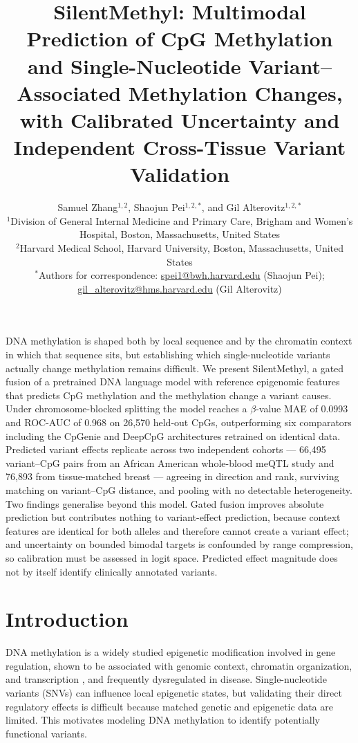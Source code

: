 \documentclass[10pt,letterpaper,twocolumn]{article}
\title{\LARGE\bfseries SilentMethyl: Multimodal Prediction of CpG Methylation and
Single-Nucleotide Variant--Associated Methylation Changes, with Calibrated
Uncertainty and Independent Cross-Tissue Variant Validation}
\author{%
  Samuel Zhang$^{1,2}$, Shaojun Pei$^{1,2,*}$, and Gil Alterovitz$^{1,2,*}$ \\[0.5em]
  \small $^{1}$Division of General Internal Medicine and Primary Care, Brigham and Women's Hospital, Boston, Massachusetts, United States \\
  \small $^{2}$Harvard Medical School, Harvard University, Boston, Massachusetts, United States \\[0.5em]
  \small $^{*}$Authors for correspondence: \href{mailto:spei1@bwh.harvard.edu}{spei1@bwh.harvard.edu} (Shaojun Pei); \href{mailto:gil\_alterovitz@hms.harvard.edu}{gil\_alterovitz@hms.harvard.edu} (Gil Alterovitz)
}
\date{}
\renewenvironment{abstract}{%
  \section*{\abstractname}\vspace{-0.75em}\small
}{\par\vspace{0.6em}}
\begin{document}
\maketitle

\begin{abstract}
\color{addedred}
DNA methylation is shaped both by local sequence and by the chromatin context in
which that sequence sits, but establishing which single-nucleotide variants
actually change methylation remains difficult. We present SilentMethyl, a gated
fusion of a pretrained DNA language model with reference epigenomic features that
predicts CpG methylation and the methylation change a variant causes. Under
chromosome-blocked splitting the model reaches a $\beta$-value MAE of 0.0993 and
ROC-AUC of 0.968 on 26{,}570 held-out CpGs, outperforming six comparators
including the CpGenie and DeepCpG architectures retrained on identical data.
Predicted variant effects replicate across two independent cohorts --- 66{,}495
variant--CpG pairs from an African American whole-blood meQTL study and 76{,}893
from tissue-matched breast --- agreeing in direction and rank, surviving matching
on variant--CpG distance, and pooling with no detectable heterogeneity. Two
findings generalise beyond this model. Gated fusion improves absolute prediction
but contributes nothing to variant-effect prediction, because context features
are identical for both alleles and therefore cannot create a variant effect; and
uncertainty on bounded bimodal targets is confounded by range compression, so
calibration must be assessed in logit space. Predicted effect magnitude does not
by itself identify clinically annotated variants.

\end{abstract}

\section{Introduction}

DNA methylation is a widely studied epigenetic modification involved in gene regulation, shown to be associated with genomic context, chromatin organization, and transcription \cite{jones2012functions,schubeler2015function}, and frequently dysregulated in disease. Single-nucleotide variants (SNVs) can influence local epigenetic states, but validating their direct regulatory effects is difficult because matched genetic and epigenetic data are limited. This motivates modeling DNA methylation to identify potentially functional variants.
\end{document}
